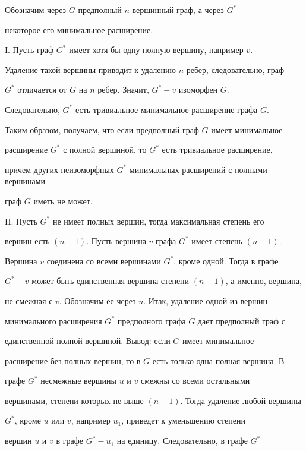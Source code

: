 \begin{pf}


Обозначим через $G$ предполный $n$-вершинный граф, а через $G^*$ ---


некоторое его минимальное расширение.





I. Пусть граф $G^*$ имеет хотя бы одну полную вершину, например $v$.


Удаление такой вершины приводит к удалению $n$ ребер, следовательно, граф


$G^*$ отличается от $G$ на $n$ ребер. Значит, $G^*-v$ изоморфен $G$.


Следовательно, $G^*$ есть тривиальное минимальное расширение графа $G$.


Таким образом, получаем, что если предполный граф $G$ имеет минимальное


расширение $G^*$ с полной вершиной, то $G^*$ есть тривиальное расширение,


причем других неизоморфных $G^*$ минимальных расширений с полными вершинами


граф $G$ иметь не может.





II. Пусть $G^*$ не имеет полных вершин, тогда максимальная степень его


вершин есть $(n-1)$. Пусть вершина $v$ графа $G^*$ имеет степень $(n-1)$.


Вершина $v$ соединена со всеми вершинами $G^*$, кроме одной. Тогда в графе


$G^*-v$ может быть единственная вершина степени $(n-1)$, а именно, вершина,


не смежная с $v$. Обозначим ее через $u$. Итак, удаление одной из вершин


минимального расширения $G^*$ предполного графа $G$ дает предполный граф с


единственной полной вершиной. Вывод: если $G$ имеет минимальное


расширение без полных вершин, то в $G$ есть только одна полная вершина. В


графе $G^*$ несмежные вершины $u$ и $v$ смежны со всеми остальными


вершинами, степени которых не выше $(n-1)$. Тогда удаление любой вершины


$G^*$, кроме $u$ или $v$, например $u_1$, приведет к уменьшению степени


вершин $u$ и $v$ в графе $G^*-u_1$ на единицу. Следовательно, в графе $G^*$



\end{pf}
